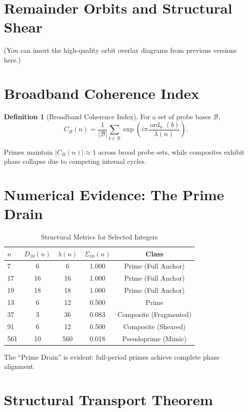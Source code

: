 \documentclass[11pt,a4paper]{article}
\theoremstyle{definition}
\newtheorem{definition}{Definition}[section]
\begin{document}
\section{Remainder Orbits and Structural Shear}

(You can insert the high-quality orbit overlay diagrams from previous versions here.)

\section{Broadband Coherence Index}

\begin{definition}[Broadband Coherence Index]
For a set of probe bases \( \mathcal{B} \),
\[ C_B(n) = \frac{1}{|\mathcal{B}|} \sum_{b \in \mathcal{B}} \exp\left( i \pi \frac{\operatorname{ord}_n(b)}{\lambda(n)} \right). \]
\end{definition}

Primes maintain \( |C_B(n)| \approx 1 \) across broad probe sets, while composites exhibit phase collapse due to competing internal cycles.

\section{Numerical Evidence: The Prime Drain}

\begin{table}[htbp]
\centering
\caption{Structural Metrics for Selected Integers}
\begin{tabular}{lcccc}
\toprule
$n$ & $D_{10}(n)$ & $\lambda(n)$ & $\Sigma_{10}(n)$ & Class \\
\midrule
7   & 6  & 6  & 1.000 & Prime (Full Anchor) \\
17  & 16 & 16 & 1.000 & Prime (Full Anchor) \\
19  & 18 & 18 & 1.000 & Prime (Full Anchor) \\
13  & 6  & 12 & 0.500 & Prime \\
37  & 3  & 36 & 0.083 & Composite (Fragmented) \\
91  & 6  & 12 & 0.500 & Composite (Sheared) \\
561 & 10 & 560& 0.018 & Pseudoprime (Mimic) \\
\bottomrule
\end{tabular}
\end{table}

The ``Prime Drain'' is evident: full-period primes achieve complete phase alignment.

\section{Structural Transport Theorem}
\end{document}
